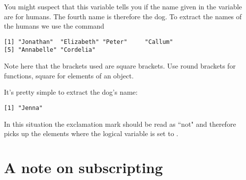 \begin{knitrout}
\color{fgcolor}\begin{kframe}
\begin{alltt}
\hlstd{> } \hlkwb{=} \hlstd{(}\hlstd{,} \hlstd{,} \hlstd{,} \hlstd{,} \hlstd{,} \hlstd{,} \hlstd{)}
\end{alltt}
\end{kframe}
\end{knitrout}
You might suspect that this variable tells you if the name given in the  variable are for humans. The fourth name is therefore the dog. To extract the names of the humans we use the command 
\begin{knitrout}
\color{fgcolor}\begin{kframe}
\begin{alltt}
\hlstd{> }
\end{alltt}
\begin{verbatim}
[1] "Jonathan"  "Elizabeth" "Peter"     "Callum"   
[5] "Annabelle" "Cordelia" 
\end{verbatim}
\end{kframe}
\end{knitrout}
Note here that the brackets used are square brackets. Use round brackets for functions, square for elements of an object. 
 
It's pretty simple to extract the dog's name: 
\begin{knitrout}
\color{fgcolor}\begin{kframe}
\begin{alltt}
\hlstd{> }\hlstd{Names[}\hlopt{!}\hlstd{Human]}
\end{alltt}
\begin{verbatim}
[1] "Jenna"
\end{verbatim}
\end{kframe}
\end{knitrout}
In this situation the exclamation mark should be read as ``not" and therefore picks up the elements where the logical variable is set to . 
 
\section{A note on subscripting} 
 

